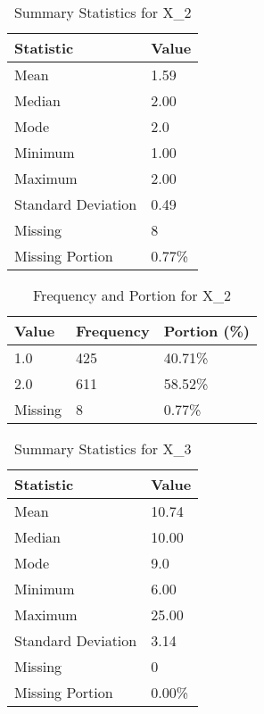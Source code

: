 \begin{table}[H]
\centering
\begin{tabular}{|l|l|}
\hline
\textbf{Statistic} & \textbf{Value} \\ \hline
Mean               & 1.59 \\ \hline
Median             & 2.00 \\ \hline
Mode               & 2.0 \\ \hline
Minimum            & 1.00 \\ \hline
Maximum            & 2.00 \\ \hline
Standard Deviation & 0.49 \\ \hline
Missing            & 8 \\ \hline
Missing Portion    & 0.77\% \\ \hline
\end{tabular}
\caption{Summary Statistics for X_2}
\end{table}

\begin{table}[H]
\centering
\begin{tabular}{|l|l|l|}
\hline
\textbf{Value} & \textbf{Frequency} & \textbf{Portion (\%)} \\ \hline
1.0 & 425 & 40.71\% \\ \hline
2.0 & 611 & 58.52\% \\ \hline
Missing & 8 & 0.77\% \\ \hline
\end{tabular}
\caption{Frequency and Portion for X_2}
\end{table}

\begin{table}[H]
\centering
\begin{tabular}{|l|l|}
\hline
\textbf{Statistic} & \textbf{Value} \\ \hline
Mean               & 10.74 \\ \hline
Median             & 10.00 \\ \hline
Mode               & 9.0 \\ \hline
Minimum            & 6.00 \\ \hline
Maximum            & 25.00 \\ \hline
Standard Deviation & 3.14 \\ \hline
Missing            & 0 \\ \hline
Missing Portion    & 0.00\% \\ \hline
\end{tabular}
\caption{Summary Statistics for X_3}
\end{table}


